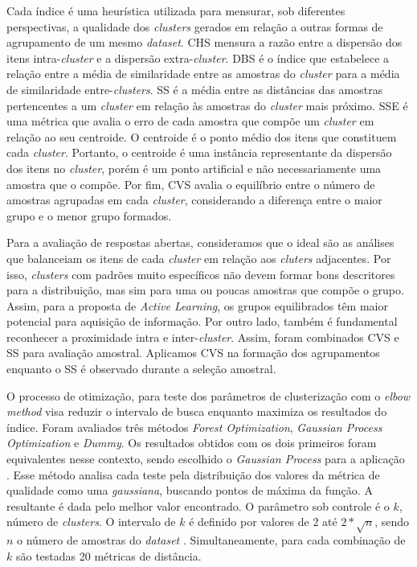 Cada índice é uma heurística utilizada para mensurar, sob diferentes perspectivas, a qualidade dos \textit{clusters} gerados em relação a outras formas de agrupamento de um mesmo \textit{dataset}. CHS mensura a razão entre a dispersão dos itens intra-\textit{cluster} e a dispersão extra-\textit{cluster}. DBS é o índice que estabelece a relação entre a média de similaridade entre as amostras do \textit{cluster} para a média de similaridade entre-\textit{clusters}. SS é a média entre as distâncias das amostras pertencentes a um \textit{cluster} em relação às amostras do \textit{cluster} mais próximo. SSE é uma métrica que avalia o erro de cada amostra que compõe um \textit{cluster} em relação ao seu centroide. O centroide é o ponto médio dos itens que constituem cada \textit{cluster}. Portanto, o centroide é uma instância representante da dispersão dos itens no \textit{cluster}, porém é um ponto artificial e não necessariamente uma amostra que o compõe. Por fim, CVS avalia o equilíbrio entre o número de amostras agrupadas em cada \textit{cluster}, considerando a diferença entre o maior grupo e o menor grupo formados.

Para a avaliação de respostas abertas, consideramos que o ideal são as análises que balanceiam os itens de cada \textit{cluster} em relação aos \textit{cluters} adjacentes. Por isso, \textit{clusters} com padrões muito específicos não devem formar bons descritores para a distribuição, mas sim para uma ou poucas amostras que compõe o grupo. Assim, para a proposta de \textit{Active Learning}, os grupos equilibrados têm maior potencial para aquisição de informação. Por outro lado, também é fundamental reconhecer a proximidade intra e inter-\textit{cluster}. Assim, foram combinados CVS e SS para avaliação amostral. Aplicamos CVS na formação dos agrupamentos enquanto o SS é observado durante a seleção amostral.


O processo de otimização, para teste dos parâmetros de clusterização com o \textit{elbow method} visa reduzir o intervalo de busca enquanto maximiza os resultados do índice. Foram avaliados três métodos \textit{Forest Optimization}, \textit{Gaussian Process Optimization} e \textit{Dummy}. Os resultados obtidos com os dois primeiros foram equivalentes nesse contexto, sendo escolhido o \textit{Gaussian Process} para a aplicação \cite{spalenza2019}. Esse método analisa cada teste pela distribuição dos valores da métrica de qualidade como uma \textit{gaussiana}, buscando pontos de máxima da função. A resultante é dada pelo melhor valor encontrado. O parâmetro sob controle é o $ k $, número de \textit{clusters}. O intervalo de $ k $ é definido por valores de $ 2 $ até $ 2 * \sqrt{n} $, sendo $ n $ o número de amostras do \textit{dataset} \cite{han2011}. Simultaneamente, para cada combinação de $ k $ são testadas 20 métricas de distância.


